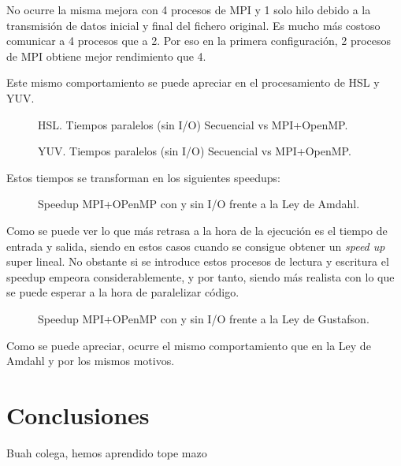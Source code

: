 \documentclass[12pt]{report} %
\begin{document}
No ocurre la misma mejora con 4 procesos de MPI y 1 solo hilo debido a la transmisión de datos inicial y
final del fichero original. Es mucho más costoso comunicar a 4 procesos que a 2. Por eso en la primera
configuración, 2 procesos de MPI obtiene mejor rendimiento que 4.

Este mismo comportamiento se puede apreciar en el procesamiento de HSL y YUV.

\begin{figure}[H]
	\makebox[\textwidth][c]{
        
    }
    \caption{HSL. Tiempos paralelos (sin I/O) Secuencial vs MPI+OpenMP.}
    \label{fig:hsl_tiempos}
\end{figure}

\begin{figure}[H]
	\makebox[\textwidth][c]{
        
    }
    \caption{YUV. Tiempos paralelos (sin I/O) Secuencial vs MPI+OpenMP.}
    \label{fig:yuv_tiempos}
\end{figure}

Estos tiempos se transforman en los siguientes speedups:

\begin{figure}[H]
	\makebox[\textwidth][c]{
        
    }
	\caption{Speedup MPI+OPenMP con y sin I/O frente a la Ley de Amdahl.}
    \label{fig:comparacion_speedup}
\end{figure}

Como se puede ver lo que más retrasa a la hora de la ejecución es el tiempo de entrada y salida, siendo en estos casos cuando se consigue obtener un \textit{speed up} super lineal. No obstante si se introduce estos procesos de lectura y escritura el speedup empeora considerablemente, y por tanto, siendo más realista con lo que se puede esperar a la hora de paralelizar código.

\begin{figure}[H]
	\makebox[\textwidth][c]{
        
    }
	\caption{Speedup MPI+OPenMP con y sin I/O frente a la Ley de Gustafson.}
    \label{fig:comparacion_speedup}
\end{figure}

Como se puede apreciar, ocurre el mismo comportamiento que en la Ley de Amdahl y por los mismos motivos.

\chapter{Conclusiones}

Buah colega, hemos aprendido tope mazo


\nocite{*} %

\clearpage
{}
\printbibliography
\end{document}
